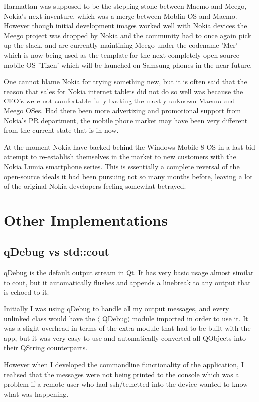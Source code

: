 Harmattan was supposed to be the stepping stone between Maemo and Meego, Nokia's next inventure, which was a merge between Moblin OS and Maemo. However though initial development images worked well with Nokia devices the Meego project was dropped by Nokia and the community had to once again pick up the slack, and are currently maintining Meego under the codename 'Mer' which is now being used as the template for the next completely open-source mobile OS 'Tizen' which will be launched on Samsung phones in the near future.

One cannot blame Nokia for trying something new, but it is often said that the reason that sales for Nokia internet tablets did not do so well was because the CEO's were not comfortable fully backing the mostly unknown Maemo and Meego OSes. Had there been more advertizing and promotional support from Nokia's PR department, the mobile phone market may have been very different from the current state that is in now.

At the moment Nokia have backed behind the Windows Mobile 8 OS in a last bid attempt to re-establish themselves in the market to new customers with the Nokia Lumia smartphone series. This is essentially a complete reversal of the open-source ideals it had been pursuing not so many months before, leaving a lot of the original Nokia developers feeling somewhat betrayed.


\section{Other Implementations}
\subsection{qDebug vs std::cout}\label{qdebug}
qDebug is the default output stream in Qt. It has very basic usage almost similar to cout, but it automatically flushes and appends a linebreak to any output that is echoed to it.

Initially I was using qDebug to handle all my output messages, and every unlinked class would have the \(\langle\) QDebug\(\rangle\) module imported in order to use it. It was a slight overhead in terms of the extra module that had to be built with the app, but it was very easy to use and automatically converted all QObjects into their QString counterparts.

However when I developed the commandline functionality of the application, I realised that the messages were not being printed to the console which was a problem if a remote user who had ssh/telnetted into the device wanted to know what was happening.

